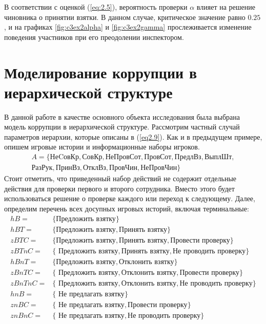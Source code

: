 \par
В соответствии с оценкой (\ref{eq:2.5}), вероятность проверки $\alpha$ влияет на решение чиновника о принятии взятки. В данном случае, критическое значение равно $0.25$, и на графиках \ref{fig:c3ex2alpha} и \ref{fig:c3ex2gamma} прослеживается изменение поведения участников при его преодолении инспектором.
\section{Моделирование коррупции в иерархической структуре}

В данной работе в качестве основного объекта исследования была выбрана модель коррупции в иерархической структуре. Рассмотрим частный случай параметров иерархии, которые описаны в (\ref{eq2.9}). Как и в предыдущем примере, опишем игровые истории и информационные наборы игроков.
\begin{align*}
	A = \{\text{НеCовКр}, \text{СовКр}, \text{НеПровСот}, \text{ПровСот}, \text{ПредлВз}, \text{ВыплШт},\\ \text{РазРук}, \text{ПринВз}, \text{ОтклВз}, \text{ПровЧин}, \text{НеПровЧин} \}
\end{align*}
Стоит отметить, что приведенный набор действий не содержит отдельные действия для проверки первого и второго сотрудника. Вместо этого будет использоваться решение о проверке каждого или переход к следующему.
Далее, определим перечень всех досупных игровых историй, включая терминальные:
\begin{align*}
	hB = & \{\text{Предложить взятку}\} \\
	hBT = & \{\text{Предложить взятку}, \text{Принять взятку}\} \\
	zBTC = & \{\text{Предложить взятку}, \text{Принять взятку}, \text{Провести проверку}\} \\
	zBTnC = & \{\text{ Предложить взятку}, \text{Принять взятку}, \text{Не проводить проверку}\} \\
	hBnT = & \{ \text{Предложить взятку}, \text{Отклонить взятку} \} \\
	zBnTC = & \{\text{ Предложить взятку}, \text{Отклонить взятку}, \text{Провести проверку}\} \\
	zBnTnC = & \{\text{ Предложить взятку}, \text{Отклонить взятку}, \text{Не проводить проверку}\} \\
	hnB = & \{\text{ Не предлагать взятку}\} \\
	znBC = & \{\text{ Не предлагать взятку}, \text{Провести проверку}\} \\
	znBnC = & \{\text{ Не предлагать взятку}, \text{Не проводить проверку} \}
\end{align*}
